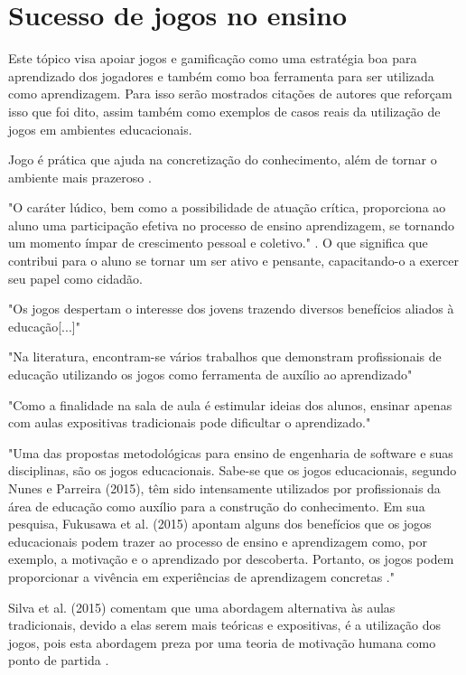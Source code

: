 
\section[Sucesso de jogos no ensino]{Sucesso de jogos no ensino}

Este tópico visa apoiar jogos e gamificação como uma estratégia boa para aprendizado dos jogadores e também como boa ferramenta para ser utilizada como aprendizagem. Para isso serão mostrados citações de autores que reforçam isso que foi dito, assim também como exemplos de casos reais da utilização de jogos em ambientes educacionais. 

Jogo é prática que ajuda na concretização do conhecimento, além de tornar o ambiente mais prazeroso \cite{jogoPratPedagoc}. 

"O caráter lúdico, bem como a possibilidade de atuação crítica, proporciona ao aluno uma participação efetiva no processo de ensino aprendizagem, se tornando um momento ímpar de crescimento pessoal e coletivo." \cite{jogoPratPedagoc}. O que significa que contribui para o aluno se tornar um ser ativo e pensante, capacitando-o a exercer seu papel como cidadão.

"Os jogos despertam o interesse dos jovens trazendo diversos benefícios aliados à educação[...]" \cite{appcalculo}

"Na literatura, encontram-se vários trabalhos que demonstram profissionais de educação utilizando os jogos como ferramenta de auxílio ao aprendizado" \cite[p. 3]{sucessoJogoEngSoft}

"Como a finalidade na sala de aula é estimular ideias dos alunos, ensinar apenas com aulas expositivas
tradicionais pode dificultar o aprendizado." \cite[p. 4]{sucessoJogoEngSoft} 

"Uma das propostas metodológicas para ensino de engenharia de software e suas disciplinas, são os jogos educacionais. Sabe-se que os jogos educacionais, segundo Nunes e Parreira (2015), têm sido intensamente utilizados por profissionais da área de educação como auxílio para a construção do conhecimento. Em sua pesquisa, Fukusawa et al. (2015) apontam alguns dos benefícios que os jogos educacionais podem trazer ao
processo de ensino e aprendizagem como, por exemplo, a motivação e o aprendizado por descoberta. Portanto, os jogos podem proporcionar a vivência em experiências de aprendizagem concretas ."

Silva et al. (2015) comentam que uma abordagem alternativa às aulas tradicionais, devido  a elas serem mais teóricas e expositivas, é a utilização dos jogos, pois esta abordagem preza por uma teoria de motivação humana como ponto de partida \cite{sucessoJogoEngSoft}.

